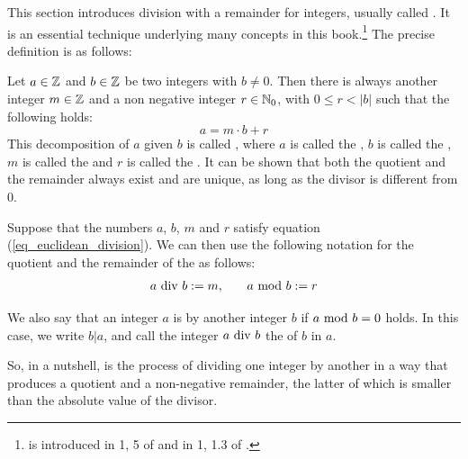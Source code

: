 This section introduces division with a remainder for integers, usually called . It is an essential technique underlying many concepts in this book.\footnote{ is introduced in \chaptname{} 1, \secname{} 5 of \cite{mignotte-1992} and in \chaptname{} 1, \secname{} 1.3 of \cite{cohen-2010}.} The precise definition is as follows:

Let $ a \in \mathbb{Z} $ and $ b \in \mathbb{Z} $ be two integers with $b\neq 0$. Then there is always another integer $ m \in \mathbb{Z} $ and a non negative integer $ r \in \mathbb{N}_0 $, with $ 0 \leq r <|b| $ such that the following holds:
\begin{equation}
\label{eq_euclidean_division}
a = m \cdot b + r
\end{equation}
This decomposition of $a$ given $b$ is called , where $ a $ is called the , $ b $ is called the , $m$ is called the  and $r$ is called the . It can be shown that both the quotient and the remainder always exist and are unique, as long as the divisor is different from $0$.
\begin{notation}
\label{eq_euclidean_division_notation}
Suppose that the numbers $a$, $b$, $m$ and $r$ satisfy equation (\ref{eq_euclidean_division}). We can then use the following notation for the quotient and the remainder of the  as follows:
\begin{equation}
\label{def_integer_division_and_modulus}
\begin{array}{lcr}
a \text{ div } b: = m, & & a \text{ mod } b: = r
\end{array}
\end{equation}

We also say that an integer $ a $ is  by another integer $ b $ if $ a \text{ mod } b = 0 $ holds. In this case, we write $ b | a $, and call the integer $a \text{ div } b$ the \label{def:cofactor} of $b$ in $a$.
\end{notation}
So, in a nutshell,  is the process of dividing one integer by another in a way that produces a quotient and a non-negative remainder, the latter of which is smaller than the absolute value of the divisor.

